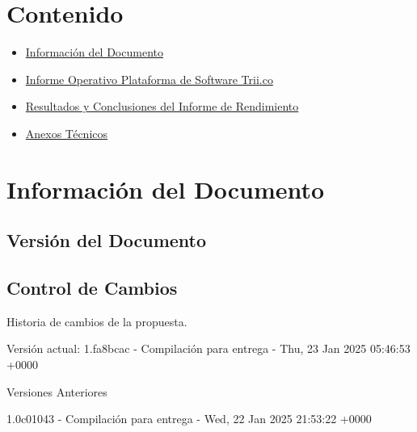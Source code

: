 \documentclass[
  paper=a4,
  ,captions=tableheading
]{scrartcl}
\providecommand{\tightlist}{%
  \setlength{\itemsep}{0pt}\setlength{\parskip}{0pt}}
\renewenvironment{quote}{\begin{customblockquote}\list{}{\rightmargin=0em\leftmargin=0em}%
\item\relax\color{blockquote-text}\ignorespaces}{\unskip\unskip\endlist\end{customblockquote}}
\begin{document}



\section{Contenido}\label{sec:contenido}

\begin{itemize}
\tightlist
\item
  \hyperref[informaciuxf3n-del-documento]{Información del Documento}
\item
  \hyperref[informe-operativo-plataforma-de-software-trii.co]{Informe
  Operativo Plataforma de Software Trii.co}
\item
  \hyperref[resultados-y-conclusiones-del-informe-de-rendimiento]{Resultados
  y Conclusiones del Informe de Rendimiento}
\item
  \hyperref[anexos-tuxe9cnicos]{Anexos Técnicos}
\end{itemize}

\newpage

\section{Información del
Documento}\label{sec:informaciuxf3n-del-documento}

\subsection{Versión del Documento}\label{sec:versiuxf3n-del-documento}

\begin{quote}
\end{quote}

\subsection{Control de Cambios}\label{sec:control-de-cambios}

Historia de cambios de la propuesta.

Versión actual: 1.fa8bcac - Compilación para entrega - Thu, 23 Jan 2025
05:46:53 +0000

Versiones Anteriores

1.0c01043 - Compilación para entrega - Wed, 22 Jan 2025 21:53:22 +0000
\end{document}
